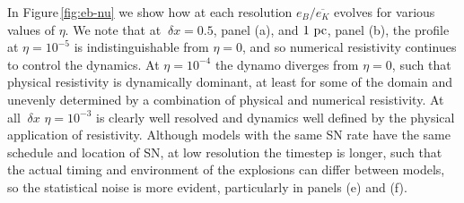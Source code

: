 \documentclass[preprint2]{aastex63}
\newcommand\Rm{{\rm Rm} }
\newcommand\pc{~ {\rm pc}}
\newcommand\dx{~ {\delta x}}
\begin{document}
In Figure\,\ref{fig:eb-nu} we show how at each resolution $e_B/\overline{e_K}$
evolves for various values of $\eta$.
We note that at $\dx=0.5$, panel (a), and $1\pc$, panel (b), the profile at
$\eta=10^{-5}$ is indistinguishable from $\eta=0$, and so numerical resistivity
continues to control the dynamics.
At $\eta=10^{-4}$ the dynamo diverges from $\eta=0$, such that physical
resistivity is dynamically dominant, at least for some of the domain and
unevenly determined by a combination of physical and numerical resistivity.
At all $\dx$ $\eta=10^{-3}$ is clearly well resolved and dynamics
well defined by the physical application of resistivity.
Although models with the same SN rate have the same schedule and location of
SN, at low resolution the timestep is longer, such that the actual timing and 
environment of the explosions can differ between models, so the statistical
noise is more evident, particularly in panels (e) and (f).



\end{document}
